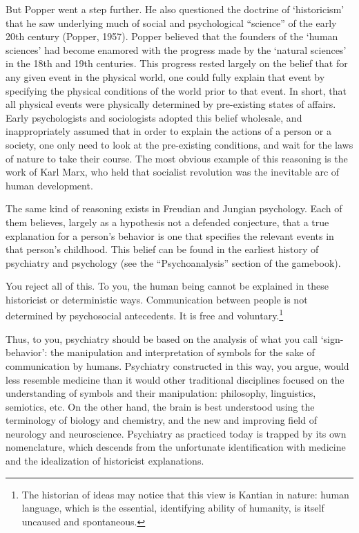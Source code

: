 \begin{refsection}
But Popper went a step further. He also questioned the doctrine of `historicism' that he saw underlying much of social and psychological ``science'' of the early 20th century (Popper, 1957). Popper believed that the founders of the `human sciences' had become enamored with the progress made by the `natural sciences' in the 18th and 19th centuries. This progress rested largely on the belief that for any given event in the physical world, one could fully explain that event by specifying the physical conditions of the world prior to that event. In short, that all physical events were physically determined by pre-existing states of affairs. Early psychologists and sociologists adopted this belief wholesale, and inappropriately assumed that in order to explain the actions of a person or a society, one only need to look at the pre-existing conditions, and wait for the laws of nature to take their course. The most obvious example of this reasoning is the work of Karl Marx, who held that socialist revolution was the inevitable arc of human development. 

The same kind of reasoning exists in Freudian and Jungian psychology. Each of them believes, largely as a hypothesis not a defended conjecture, that a true explanation for a person's behavior is one that specifies the relevant events in that person's childhood. This belief can be found in the earliest history of psychiatry and psychology (see the ``Psychoanalysis'' section of the gamebook).

You reject all of this. To you, the human being cannot be explained in these historicist or deterministic ways. Communication between people is not determined by psychosocial antecedents. It is free and voluntary.\footnote{The historian of ideas may notice that this view is Kantian in nature: human language, which is the essential, identifying ability of humanity, is itself uncaused and spontaneous.}

Thus, to you, psychiatry should be based on the analysis of what you call `sign-behavior': the manipulation and interpretation of symbols for the sake of communication by humans. Psychiatry constructed in this way, you argue, would less resemble medicine than it would other traditional disciplines focused on the understanding of symbols and their manipulation: philosophy, linguistics, semiotics, etc. On the other hand, the brain is best understood using the terminology of biology and chemistry, and the new and improving field of neurology and neuroscience. Psychiatry as practiced today is trapped by its own nomenclature, which descends from the unfortunate identification with medicine and the idealization of historicist explanations.


\end{refsection}
